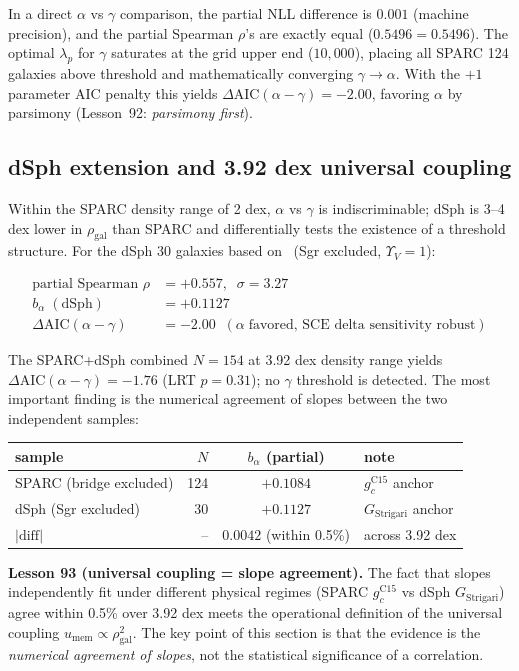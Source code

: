 \documentclass[11pt,a4paper]{article}
\newcommand{\bal}{b_{\alpha}}
\newcommand{\umem}{u_{\mathrm{mem}}}
\newcommand{\rhogal}{\rho_{\mathrm{gal}}}
\newcommand{\gc}{g_{c}}
\newcommand{\AIC}{\Delta\mathrm{AIC}}
\begin{document}
In a direct $\alpha$ vs $\gamma$ comparison, the partial NLL difference is $0.001$ (machine
precision), and the partial Spearman $\rho$'s are exactly equal ($0.5496 = 0.5496$). The optimal
$\lambda_p$ for $\gamma$ saturates at the grid upper end ($10{,}000$), placing all SPARC 124
galaxies above threshold and mathematically converging $\gamma \to \alpha$. With the $+1$ parameter
AIC penalty this yields $\AIC(\alpha - \gamma) = -2.00$, favoring $\alpha$ by parsimony
(Lesson~92: \textit{parsimony first}).

\subsection{dSph extension and 3.92 dex universal coupling}
Within the SPARC density range of 2 dex, $\alpha$ vs $\gamma$ is indiscriminable; dSph is 3--4 dex
lower in $\rhogal$ than SPARC and differentially tests the existence of a threshold structure.
For the dSph 30 galaxies based on~\citet{McConnachie2012} (Sgr excluded, $\Upsilon_V = 1$):

\begin{align*}
\text{partial Spearman } \rho &= +0.557,\;\; \sigma = 3.27 \\
\bal\;(\mathrm{dSph}) &= +0.1127 \\
\AIC(\alpha - \gamma) &= -2.00\;\;(\alpha\;\text{favored, SCE delta sensitivity robust})
\end{align*}

The SPARC+dSph combined $N = 154$ at 3.92 dex density range yields $\AIC(\alpha - \gamma) = -1.76$
(LRT $p = 0.31$); no $\gamma$ threshold is detected. The most important finding is the numerical
agreement of slopes between the two independent samples:

\begin{center}\small
\begin{tabular}{@{}lrcl@{}}
\toprule
sample & $N$ & $\bal$ (partial) & note \\
\midrule
SPARC (bridge excluded) & 124 & $+0.1084$ & $\gc^{\mathrm{C15}}$ anchor \\
dSph (Sgr excluded) & 30 & $+0.1127$ & $G_{\mathrm{Strigari}}$ anchor \\
$|\text{diff}|$ & -- & $0.0042$ (within 0.5\%) & across 3.92 dex \\
\bottomrule
\end{tabular}
\end{center}

\begin{keybox}
\textbf{Lesson 93 (universal coupling = slope agreement).}
The fact that slopes independently fit under different physical regimes (SPARC $\gc^{\mathrm{C15}}$
vs dSph $G_{\mathrm{Strigari}}$) agree within 0.5\% over 3.92 dex meets the operational definition
of the universal coupling $\umem \propto \rhogal^2$. The key point of this section is that the
evidence is the \emph{numerical agreement of slopes}, not the statistical significance of a
correlation.
\end{keybox}
\end{document}
